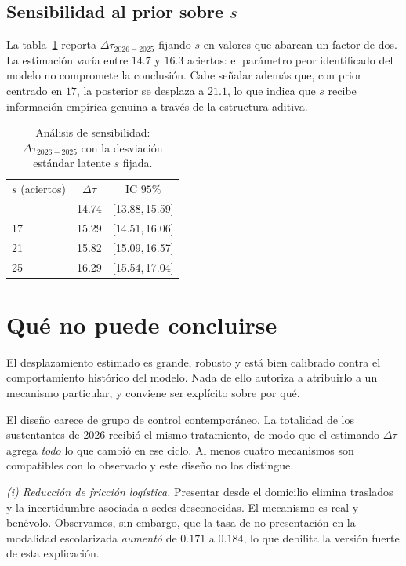 \documentclass[aps,prd,reprint,amsmath,amssymb,nofootinbib,superscriptaddress]{revtex4-2}
\begin{document}
\subsection{Sensibilidad al prior sobre $s$}\label{sec:sens}

La tabla~\ref{tab:sens} reporta $\Delta\tau_{2026-2025}$ fijando $s$ en
valores que abarcan un factor de dos. La estimaci\'on var\'ia entre
$14.7$ y $16.3$ aciertos: el par\'ametro peor identificado del modelo no
compromete la conclusi\'on. Cabe se\~nalar adem\'as que, con prior
centrado en $17$, la posterior se desplaza a $21.1$, lo que indica que
$s$ recibe informaci\'on emp\'irica genuina a trav\'es de la estructura
aditiva.

\begin{table}[t]
\caption{An\'alisis de sensibilidad: $\Delta\tau_{2026-2025}$ con la
desviaci\'on est\'andar latente $s$ fijada.}
\label{tab:sens}
\begin{ruledtabular}
\begin{tabular}{lcc}
$s$ (aciertos) & $\Delta\tau$ & IC $95\%$ \\ \colrule
13 & 14.74 & [13.88,\,15.59] \\
17 & 15.29 & [14.51,\,16.06] \\
21 & 15.82 & [15.09,\,16.57] \\
25 & 16.29 & [15.54,\,17.04] \\
\end{tabular}
\end{ruledtabular}
\end{table}

\section{Qu\'e no puede concluirse}\label{sec:discusion}

El desplazamiento estimado es grande, robusto y est\'a bien calibrado
contra el comportamiento hist\'orico del modelo. Nada de ello autoriza a
atribuirlo a un mecanismo particular, y conviene ser expl\'icito sobre por
qu\'e.

El dise\~no carece de grupo de control contempor\'aneo. La totalidad de
los sustentantes de 2026 recibi\'o el mismo tratamiento, de modo que el
estimando $\Delta\tau$ agrega \emph{todo} lo que cambi\'o en ese ciclo. Al
menos cuatro mecanismos son compatibles con lo observado y este dise\~no
no los distingue.

\emph{(i) Reducci\'on de fricci\'on log\'istica.} Presentar desde el
domicilio elimina traslados y la incertidumbre asociada a sedes
desconocidas. El mecanismo es real y ben\'evolo. Observamos, sin embargo,
que la tasa de no presentaci\'on en la modalidad escolarizada
\emph{aument\'o} de $0.171$ a $0.184$, lo que debilita la versi\'on fuerte
de esta explicaci\'on.
\end{document}
